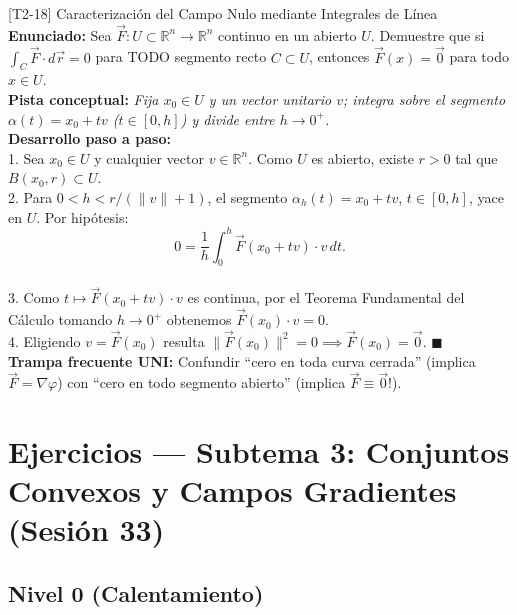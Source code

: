\documentclass[11pt,a4paper]{article}
\begin{document}
\begin{ejerciciobox}{[T2-18] Caracterización del Campo Nulo mediante Integrales de Línea}
\textbf{Enunciado:} Sea $\vec{F}: U \subset \mathbb{R}^n \to \mathbb{R}^n$ continuo en un abierto $U$. Demuestre que si $\int_C \vec{F}\cdot d\vec{r} = 0$ para TODO segmento recto $C \subset U$, entonces $\vec{F}(x) = \vec{0}$ para todo $x \in U$.\\[0.2cm]
\textbf{Pista conceptual:} \emph{Fija $x_0 \in U$ y un vector unitario $v$; integra sobre el segmento $\alpha(t) = x_0 + tv$ ($t \in [0, h]$) y divide entre $h \to 0^+$.}\\[0.2cm]
\textbf{Desarrollo paso a paso:}\\
1. Sea $x_0 \in U$ y cualquier vector $v \in \mathbb{R}^n$. Como $U$ es abierto, existe $r > 0$ tal que $B(x_0, r) \subset U$.\\
2. Para $0 < h < r/(\|v\|+1)$, el segmento $\alpha_h(t) = x_0 + tv$, $t\in[0,h]$, yace en $U$. Por hipótesis:\\
$$0 = \frac{1}{h}\int_0^h \vec{F}(x_0 + tv)\cdot v\,dt.$$\\
3. Como $t \mapsto \vec{F}(x_0 + tv)\cdot v$ es continua, por el Teorema Fundamental del Cálculo tomando $h \to 0^+$ obtenemos $\vec{F}(x_0)\cdot v = 0$.\\
4. Eligiendo $v = \vec{F}(x_0)$ resulta $\|\vec{F}(x_0)\|^2 = 0 \implies \vec{F}(x_0) = \vec{0}$. $\blacksquare$\\[0.2cm]
\textbf{Trampa frecuente UNI:} Confundir ``cero en toda curva cerrada'' (implica $\vec{F} = \nabla\varphi$) con ``cero en todo segmento abierto'' (implica $\vec{F} \equiv \vec{0}$!).
\end{ejerciciobox}

\section{Ejercicios --- Subtema 3: Conjuntos Convexos y Campos Gradientes (Sesión 33)}

\subsection{Nivel 0 (Calentamiento)}
\end{document}
